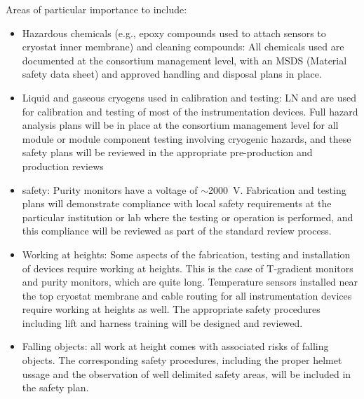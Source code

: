 Areas of particular importance to  include:
\begin{itemize}
\item Hazardous chemicals (e.g., epoxy compounds used to attach sensors to cryostat inner membrane) and cleaning compounds:
  All chemicals used are documented at the consortium management level, with an MSDS (Material safety data sheet) and approved handling and disposal plans in place.

\item Liquid and gaseous cryogens used in calibration and testing: LN and \lar are used for calibration and testing of most of the instrumentation devices.
  Full hazard analysis plans will be in place
    at the consortium management level for all module or
  module component testing involving cryogenic hazards, and these safety plans will be reviewed in the appropriate pre-production and production reviews

\item {} safety:  Purity monitors have a voltage of $\sim$\SI{2000}{V}. Fabrication and testing plans will demonstrate compliance with local
   safety requirements at the particular institution or lab where the testing or operation is performed, and this compliance will be reviewed as part of the standard review process.


\item Working at heights: Some aspects of the fabrication, testing and installation of  devices require working at heights. This is the 
  case of T-gradient monitors and purity monitors, which are quite long. %
  Temperature sensors installed near the top cryostat membrane and cable routing for all instrumentation devices
  require working at heights as well. The appropriate safety procedures including lift and harness training will be designed and reviewed. 
  
\item Falling objects: all work at height comes with associated risks of falling objects. The corresponding safety procedures, including the proper helmet ussage 
  and the observation of  well delimited safety areas, will be included in the safety plan. 
\end{itemize}
  

  

